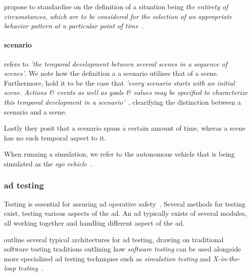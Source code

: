 \citeauthor{scenes} propose to standardise on the definition of a situation being \textit{
    the entirety of circumstances, which  are to be considered for the selection of an
    appropriate behavior pattern at a particular point of time}~\cite[985]{scenes}.

\paragraph{scenario} refers to \textit{'the temporal development between several scenes in a sequence
    of scenes'}\cite[986]{scenes}. We note how the definition a a scenario utilises that of a scene.
Furthermore, \citeauthor{scenes} hold it to be the case that \textit{'every scenario starts with an
    initial scene. Actions \& events as well as goals \& values may be  specified to characterize
    this temporal development in a scenario'}~\cite[986]{scenes}, clearifying the distinction
between a scenario and a scene.

Lastly they posit that a scenario spans a certain amount of time, wheras a scene has no such
temporal aspect to it.


When running a simulation, we refer to the autonomous vehicle that is being
simulated as the \textit{ego vehicle}~\cite{egoDefinition}.




\subsubsection{\acrlong{ad} testing}

Testing is essential for assuring \acrlong{ad} operative safety~\cite[163]{ADTestingReview16}.
Several methods for testing exist, testing various aspects of the \acrlong{ad}. An \acrshort{ad}
typically exists of several modules, all working together and handling different aspect of the
\acrlong{ad}.

\citeauthor{ADTestingReview16} outline several typical architectures for \acrshort{ad} testing,
drawing on traditional software testing traditions outlining how \textit{software testing} can be
used alongside more specialized \acrshort{ad} testing techniques such as \textit{simulation testing}
and \textit{X-in-the-loop testing}~\cite[163-164]{ADTestingReview16}.

